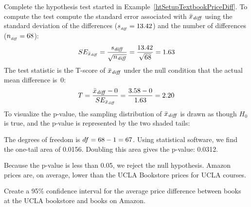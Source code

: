 \begin{examplewrap}
\begin{nexample}{Complete the hypothesis test started
    in Example~\ref{htSetupTextbookPriceDiff}.}
  \label{SEAndTScoreTextbookPriceDiff}
  To compute the test  compute the standard error associated with
  $\bar{x}_{\text{\emph{diff}}}$ using the standard
  deviation of the differences
  ($s_{_{\text{\emph{diff}}}} = 13.42{}$)
  and the number of differences
  ($n_{_{\text{\emph{diff}}}} = 68{}$):
  \begin{align*}
  SE_{\bar{x}_{\text{\emph{diff}}}}
    = \frac{s_{\text{\emph{diff}}}}{\sqrt{n_{\text{\emph{diff}}}}}
    = \frac{13.42{}}{\sqrt{68{}}} = 1.63{}
  \end{align*}
  The test statistic is the T-score of
  $\bar{x}_{\text{\emph{diff}}}$
  under the null condition that the actual mean
  difference is~0:
  \begin{align*}
  T
    = \frac{\bar{x}_{\text{\emph{diff}}} - 0}
        {SE_{\bar{x}_{\text{\emph{diff}}}}}
    = \frac{3.58{} - 0}{1.63{}} = 2.20
  \end{align*}
  To visualize the p-value, the sampling distribution
  of $\bar{x}_{\text{\emph{diff}}}$ is drawn as though
  $H_0$ is true,
  and the p-value is represented by the two shaded tails:
  \begin{center}
  \end{center}
  The degrees of freedom is
  $df = 68{} - 1 = 67{}$.
  Using statistical software, we find the
  one-tail area of 0.0156.
  Doubling this area gives the p-value: 0.0312.

  Because the p-value is less than 0.05,
  we reject the null hypothesis.
  Amazon prices are, on average, lower than the
  UCLA Bookstore prices for UCLA courses.
\end{nexample}
\end{examplewrap}

\D{\newpage}

\begin{exercisewrap}
\begin{nexercise}
Create a 95\% confidence interval for the average
price difference between books at the UCLA bookstore
and books on Amazon.\footnotemark{}
\end{nexercise}
\end{exercisewrap}

